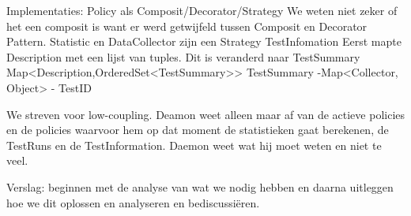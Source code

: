 \documentclass[i1]{oss}
\begin{document}
Implementaties:
Policy als Composit/Decorator/Strategy
We weten niet zeker of het een composit is want er werd getwijfeld tussen Composit en Decorator Pattern. 
Statistic en DataCollector zijn een Strategy
TestInfomation
Eerst mapte Description met een lijst van tuples. Dit is veranderd naar TestSummary
Map<Description,OrderedSet<TestSummary>>
	TestSummary	-Map<Collector, Object>
			- TestID


We streven voor low-coupling. Deamon weet alleen maar af van de actieve policies en de policies waarvoor hem op dat moment de statistieken gaat berekenen, de TestRuns en de TestInformation. Daemon weet wat hij moet weten en niet te veel. 

Verslag: beginnen met de analyse van wat we nodig hebben en daarna uitleggen hoe we dit oplossen en analyseren en bediscussiëren.

 
\end{document}
